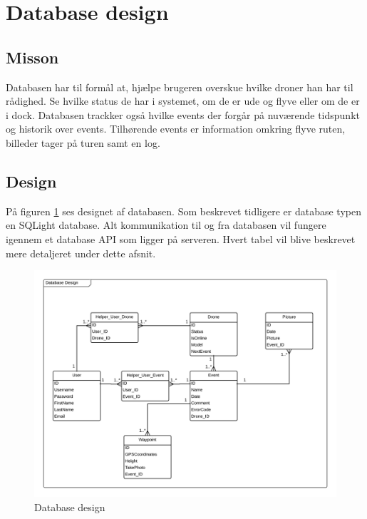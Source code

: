 \section{Database design}

\subsection{Misson}
Databasen har til formål at, hjælpe brugeren overskue hvilke droner han har til rådighed. Se hvilke status de har i systemet, om de er ude og flyve eller om de er i dock. Databasen trackker også hvilke events der forgår på nuværende tidspunkt og historik over events. Tilhørende events er information omkring flyve ruten, billeder tager på turen samt en log.

\subsection{Design}
På figuren \ref{fig:database_design} ses designet af databasen. Som beskrevet tidligere er database typen en SQLight database. Alt kommunikation til og fra databasen vil fungere igennem et database API som ligger på serveren. Hvert tabel vil blive beskrevet mere detaljeret under dette afsnit.

\vspace{-5pt}
\begin{figure}[H]
	\centering
	\includegraphics[width=1\textwidth]{Billeder/database/database_design.png}
	\vspace{-5pt}
	\caption{Database design}
	\label{fig:database_design}
\end{figure}

